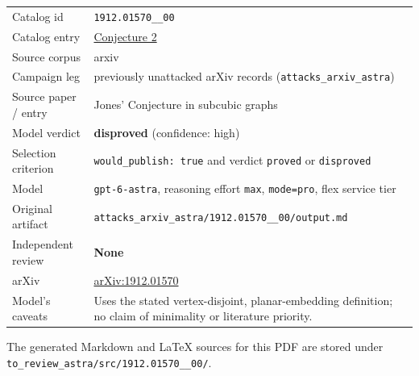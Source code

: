 \documentclass[
  11pt,
  a4paper,
]{article}
\newcounter{none} %
\begin{document}
{\def\LTcaptype{none} %
\begin{longtable}[]{@{}
  >{\raggedright\arraybackslash}p{}
  >{\raggedright\arraybackslash}p{}@{}}
\toprule\noalign{}
\endhead
\bottomrule\noalign{}
\endlastfoot
Catalog id & \texttt{1912.01570\_\_00} \\
Catalog entry &
\href{https://graph-theory-ai.github.io/graph-conjectures/arxiv/1912.01570__00/}{Conjecture
2} \\
Source corpus & arxiv \\
Campaign leg & previously unattacked arXiv records
(\texttt{attacks\_arxiv\_astra}) \\
Source paper / entry & Jones' Conjecture in subcubic graphs \\
Model verdict & \textbf{disproved} (confidence: high) \\
Selection criterion & \texttt{would\_publish:\ true} and verdict
\texttt{proved} or \texttt{disproved} \\
Model & \texttt{gpt-6-astra}, reasoning effort \texttt{max},
\texttt{mode=pro}, flex service tier \\
Original artifact &
\texttt{attacks\_arxiv\_astra/1912.01570\_\_00/output.md} \\
Independent review & \textbf{None} \\
arXiv & \href{https://arxiv.org/abs/1912.01570}{arXiv:1912.01570} \\
Model's caveats & Uses the stated vertex-disjoint, planar-embedding
definition; no claim of minimality or literature priority. \\
\end{longtable}
}

The generated Markdown and LaTeX sources for this PDF are stored under
\texttt{to\_review\_astra/src/1912.01570\_\_00/}.
\end{document}
